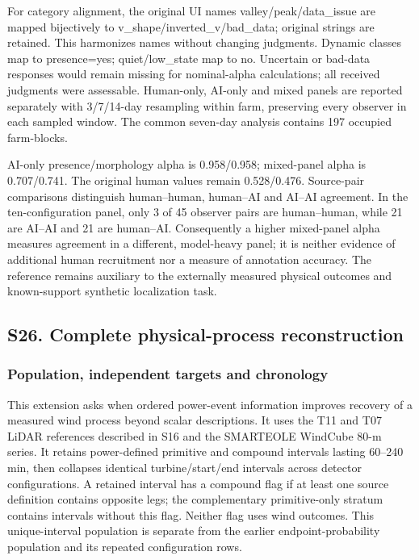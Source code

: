 \documentclass[a4paper,11pt]{article}
\begin{document}
For category alignment, the original UI names valley/peak/data\_issue are mapped bijectively to v\_shape/inverted\_v/bad\_data; original strings are retained. This harmonizes names without changing judgments. Dynamic classes map to presence=yes; quiet/low\_state map to no. Uncertain or bad-data responses would remain missing for nominal-alpha calculations; all received judgments were assessable. Human-only, AI-only and mixed panels are reported separately with 3/7/14-day resampling within farm, preserving every observer in each sampled window. The common seven-day analysis contains 197 occupied farm-blocks.

AI-only presence/morphology alpha is 0.958/0.958; mixed-panel alpha is 0.707/0.741. The original human values remain 0.528/0.476. Source-pair comparisons distinguish human--human, human--AI and AI--AI agreement. In the ten-configuration panel, only 3 of 45 observer pairs are human--human, while 21 are AI--AI and 21 are human--AI. Consequently a higher mixed-panel alpha measures agreement in a different, model-heavy panel; it is neither evidence of additional human recruitment nor a measure of annotation accuracy. The reference remains auxiliary to the externally measured physical outcomes and known-support synthetic localization task.

\subsection{S26. Complete physical-process reconstruction}\label{s26.-complete-physical-process-reconstruction}

\subsubsection{Population, independent targets and chronology}\label{population-independent-targets-and-chronology}

This extension asks when ordered power-event information improves recovery of a measured wind process beyond scalar descriptions. It uses the T11 and T07 LiDAR references described in S16 and the SMARTEOLE WindCube 80-m series. It retains power-defined primitive and compound intervals lasting 60--240 min, then collapses identical turbine/start/end intervals across detector configurations. A retained interval has a compound flag if at least one source definition contains opposite legs; the complementary primitive-only stratum contains intervals without this flag. Neither flag uses wind outcomes. This unique-interval population is separate from the earlier endpoint-probability population and its repeated configuration rows.
\end{document}
